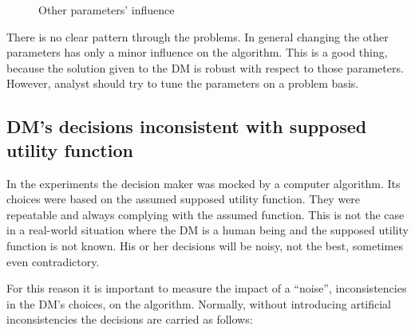\begin{figure}
{{    }
  }
  \caption{Other parameters' influence}
  \label{params2}
\end{figure}

There is no clear pattern through the problems. In general changing the other
parameters has only a minor influence on the algorithm. This is a good thing,
because the solution given to the DM is robust with respect to those
parameters. However, analyst should try to tune the parameters on a problem
basis.

\subsection{DM's decisions inconsistent with supposed utility function}
\label{dm-noise}


In the experiments the decision maker was mocked by a computer algorithm. Its
choices were based on the assumed supposed utility function. They were
repeatable and always complying with the assumed function. This is not the
case in a real-world situation where the DM is a human being and the supposed
utility function is not known. His or her decisions will be noisy, not the
best, sometimes even contradictory.

For this reason it is important to measure the impact of a ``noise'',
inconsistencies in the DM's choices, on the algorithm. Normally, without
introducing artificial inconsistencies the decisions are carried as follows:

